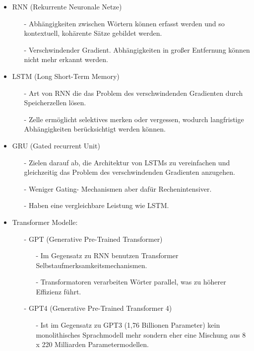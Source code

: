 \documentclass[12pt]{article}
\begin{document}
\begin{itemize}
	\item RNN (Rekurrente Neuronale Netze)\cite[vgl.]{AIML2024}
	      \begin{itemize}
		      \item[-] Abhängigkeiten zwischen Wörtern können erfasst werden und so kontextuell, kohärente Sätze gebildet werden.
		      \item[-] Verschwindender Gradient. Abhängigkeiten in großer Entfernung können nicht mehr erkannt werden.
	      \end{itemize}
	\item LSTM (Long Short-Term Memory)\cite[vgl.]{AIML2024}
	      \begin{itemize}
		      \item[-] Art von RNN die das Problem des verschwindenden Gradienten durch Speicherzellen lösen.
		      \item[-] Zelle ermöglicht selektives merken oder vergessen, wodurch langfristige Abhängigkeiten berücksichtigt werden können.
	      \end{itemize}
	\item GRU (Gated recurrent Unit)\cite[vgl.]{AIML2024}
	      \begin{itemize}
		      \item[-] Zielen darauf ab, die Architektur von LSTMs zu vereinfachen und gleichzeitig das Problem des verschwindenden Gradienten anzugehen.
		      \item[-] Weniger Gating- Mechanismen aber dafür Rechenintensiver.
		      \item[-] Haben eine vergleichbare Leistung wie LSTM.
	      \end{itemize}
	\item Transformer Modelle:\cite[vgl.]{AIML2024}
	      \begin{itemize}
		      \item[-] GPT (Generative Pre-Trained Transformer)
		            \begin{itemize}
			            \item[-] Im Gegensatz zu RNN benutzen Transformer Selbstaufmerksamkeitsmechanismen.
			            \item[-] Transformatoren verarbeiten Wörter parallel, was zu höherer Effizienz führt.
		            \end{itemize}
		      \item[-] GPT4 (Generative Pre-Trained Transformer 4)
		            \begin{itemize}
			            \item[-] Ist im Gegensatz zu GPT3 (1,76 Billionen Parameter) kein monolithisches Sprachmodell mehr sondern eher eine Mischung aus 8 x 220 Milliarden Parametermodellen. \cite{Spriesterbach2023}

\end{itemize}
\end{itemize}
\end{itemize}
\end{document}
